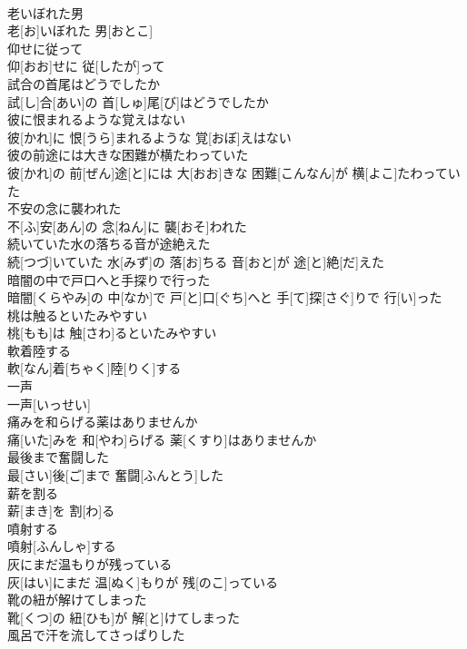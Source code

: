 \documentclass[8pt]{extreport}
\begin{document}
\begin{CJK}{UTF8}{min}
\\	老いぼれた男	
\\	老[お]いぼれた 男[おとこ]
\\	仰せに従って	
\\	仰[おお]せに 従[したが]って
\\	試合の首尾はどうでしたか	
\\	試[し]合[あい]の 首[しゅ]尾[び]はどうでしたか
\\	彼に恨まれるような覚えはない	
\\	彼[かれ]に 恨[うら]まれるような 覚[おぼ]えはない
\\	彼の前途には大きな困難が横たわっていた	
\\	彼[かれ]の 前[ぜん]途[と]には 大[おお]きな 困難[こんなん]が 横[よこ]たわっていた
\\	不安の念に襲われた	
\\	不[ふ]安[あん]の 念[ねん]に 襲[おそ]われた
\\	続いていた水の落ちる音が途絶えた	
\\	続[つづ]いていた 水[みず]の 落[お]ちる 音[おと]が 途[と]絶[だ]えた
\\	暗闇の中で戸口へと手探りで行った	
\\	暗闇[くらやみ]の 中[なか]で 戸[と]口[ぐち]へと 手[て]探[さぐ]りで 行[い]った
\\	桃は触るといたみやすい	
\\	桃[もも]は 触[さわ]るといたみやすい
\\	軟着陸する	
\\	軟[なん]着[ちゃく]陸[りく]する
\\	一声	
\\	一声[いっせい]
\\	痛みを和らげる薬はありませんか	
\\	痛[いた]みを 和[やわ]らげる 薬[くすり]はありませんか
\\	最後まで奮闘した	
\\	最[さい]後[ご]まで 奮闘[ふんとう]した
\\	薪を割る	
\\	薪[まき]を 割[わ]る
\\	噴射する	
\\	噴射[ふんしゃ]する
\\	灰にまだ温もりが残っている	
\\	灰[はい]にまだ 温[ぬく]もりが 残[のこ]っている
\\	靴の紐が解けてしまった	
\\	靴[くつ]の 紐[ひも]が 解[と]けてしまった
\\	風呂で汗を流してさっぱりした	

\end{CJK}
\end{document}
